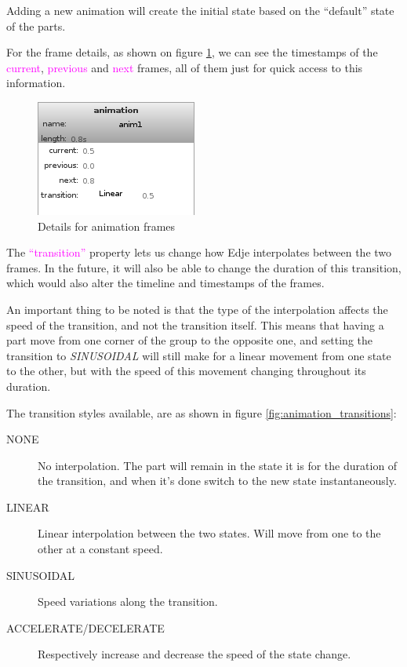 \documentclass[a4paper]{profusion}
\newcommand{\GUILabel}[1]{\textcolor{magenta}{#1}}
\begin{document}
Adding a new animation will create the initial state based on the
``default'' state of the parts.

For the frame details, as shown on figure
\ref{fig:animation_frame_details}, we can see the timestamps of the
\GUILabel{current}, \GUILabel{previous} and \GUILabel{next} frames,
all of them just for quick access to this information.

\begin{figure}[h!]
  \centering
  \includegraphics{images/animation_frame_details.png}
  \caption{Details for animation frames}
  \label{fig:animation_frame_details}
\end{figure}

The \GUILabel{``transition''} property lets us change how Edje
interpolates between the two frames. In the future, it will also be
able to change the duration of this transition, which would also alter
the timeline and timestamps of the frames.

An important thing to be noted is that the type of the interpolation
affects the speed of the transition, and not the transition
itself. This means that having a part move from one corner of the
group to the opposite one, and setting the transition to
\emph{SINUSOIDAL} will still make for a linear movement from one state
to the other, but with the speed of this movement changing throughout
its duration.

The transition styles available, are as shown in figure
\ref{fig:animation_transitions}:
\begin{description}
\item[NONE] No interpolation. The part will remain in the state it is
  for the duration of the transition, and when it's done switch to the
  new state instantaneously.
\item[LINEAR] Linear interpolation between the two states. Will move
  from one to the other at a constant speed.
\item[SINUSOIDAL] Speed variations along the transition.
\item[ACCELERATE/DECELERATE] Respectively increase and decrease the
  speed of the state change.
\end{description}
\end{document}
